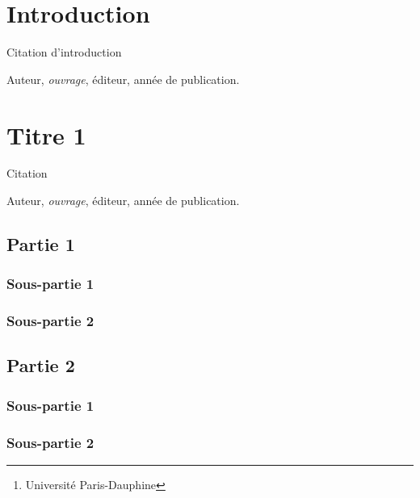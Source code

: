 \documentclass[french, 12pt]{report}
\title{}
\author{Louis Brulé Naudet\thanks{Université Paris-Dauphine}}
\date{\today}
\begin{document}
{
\sloppy

\emptypage
\nobibliography*



\chapter*{Introduction}
\og Citation d'introduction\fg\par

\textemdash Auteur, \emph{ouvrage}, éditeur, année de publication.\par
\vspace{0.8cm}

\newpage

\chapter{Titre 1}
\flushbottom
{}
\og Citation\fg{}\par
\textemdash Auteur, \emph{ouvrage}, éditeur, année de publication.\par
\vspace{0.8cm}

\section{Partie 1}
\subsection{Sous-partie 1}
\subsection{Sous-partie 2}

\section{Partie 2}
\subsection{Sous-partie 1}
\subsection{Sous-partie 2}

}
\end{document}
